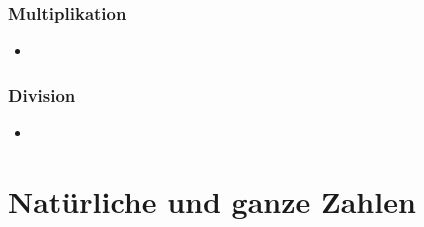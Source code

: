 \documentclass{scrartcl}
\begin{document}


\subsubsection{Multiplikation}

\begin{itemize}
\item
\end{itemize}



\subsubsection{Division}

\begin{itemize}
\item
\end{itemize}




%
%

\section{Natürliche und ganze Zahlen}

\end{document}

